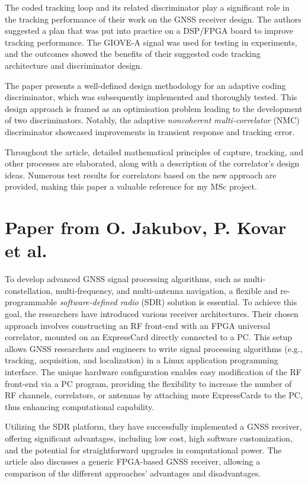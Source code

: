 The coded tracking loop and its related discriminator play a significant role in the tracking performance of their work on the GNSS receiver design. The authors suggested a plan that was put into practice on a DSP/FPGA board to improve tracking performance. The GIOVE-A signal was used for testing in experiments, and the outcomes showed the benefits of their suggested code tracking architecture and discriminator design.

The paper presents a well-defined design methodology for an adaptive coding discriminator, which was subsequently implemented and thoroughly tested. This design approach is framed as an optimisation problem leading to the development of two discriminators. Notably, the adaptive \textit{noncoherent multi-correlator} (NMC) discriminator showcased improvements in transient response and tracking error.

Throughout the article, detailed mathematical principles of capture, tracking, and other processes are elaborated, along with a description of the correlator's design ideas. Numerous test results for correlators based on the new approach are provided, making this paper a valuable reference for my MSc project.

\section{Paper from O. Jakubov, P. Kovar et al.\texorpdfstring{\cite{RN155}}{}}
To develop advanced GNSS signal processing algorithms, such as multi-constellation, multi-frequency, and multi-antenna navigation, a flexible and re-programmable \textit{software-defined radio} (SDR) solution is essential. To achieve this goal, the researchers have introduced various receiver architectures. Their chosen approach involves constructing an RF front-end with an FPGA universal correlator, mounted on an ExpressCard directly connected to a PC. This setup allows GNSS researchers and engineers to write signal processing algorithms (e.g., tracking, acquisition, and localization) in a Linux application programming interface. The unique hardware configuration enables easy modification of the RF front-end via a PC program, providing the flexibility to increase the number of RF channels, correlators, or antennas by attaching more ExpressCards to the PC, thus enhancing computational capability.

Utilizing the SDR platform, they have successfully implemented a GNSS receiver, offering significant advantages, including low cost, high software customization, and the potential for straightforward upgrades in computational power. The article also discusses a generic FPGA-based GNSS receiver, allowing a comparison of the different approaches' advantages and disadvantages.

